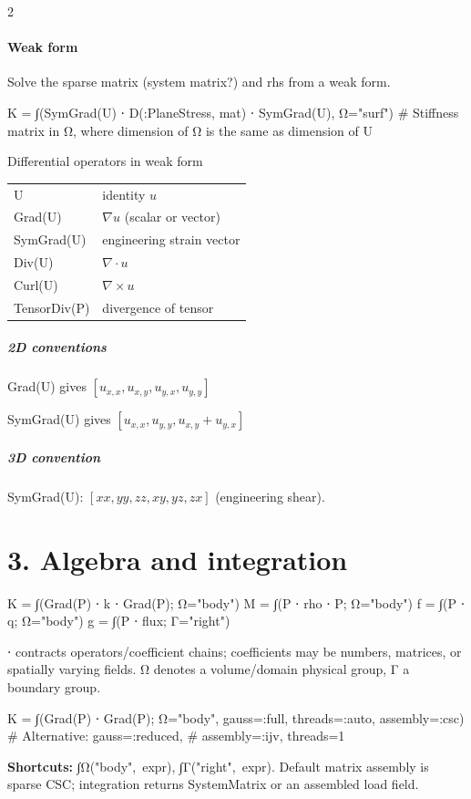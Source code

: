\documentclass[a4paper,11pt]{extarticle}
\newcommand{\code}[1]{\mbox{\ttfamily\small #1}}
\begin{document}
\begin{multicols}{2}
\paragraph{Weak form} Solve the sparse matrix (system matrix?) and rhs from a weak form.
\begin{julia}
K = ∫(SymGrad(U) ⋅ D(:PlaneStress, mat) ⋅ SymGrad(U), Ω="surf")		# Stiffness matrix in Ω, where dimension of Ω is the same as dimension of U 
\end{julia}
Differential operators in weak form

\begin{tabular}{@{}ll@{}}
\code{U} & identity $u$\\
\code{Grad(U)} & $\nabla u$ (scalar or vector)\\
\code{SymGrad(U)} & engineering strain vector\\
\code{Div(U)} & $\nabla\!\cdot u$\\
\code{Curl(U)} & $\nabla\!\times u$\\
\code{TensorDiv(P)} & divergence of tensor\\
\end{tabular}\par
\subparagraph{2D conventions} 

\code{Grad(U)} gives $[u_{x,x},u_{x,y},u_{y,x},u_{y,y}]$

\code{SymGrad(U)} gives $[u_{x,x},u_{y,y},u_{x,y}+u_{y,x}]$

\subparagraph{3D convention}

\code{SymGrad(U)}: $[xx,yy,zz,xy,yz,zx]$ (engineering shear).
\section{3. Algebra and integration}
\begin{julia}
K = ∫(Grad(P) ⋅ k ⋅ Grad(P); Ω="body")
M = ∫(P ⋅ rho ⋅ P; Ω="body")
f = ∫(P ⋅ q; Ω="body")
g = ∫(P ⋅ flux; Γ="right")
\end{julia}
\code{⋅} contracts operators/coefficient chains; coefficients may be numbers, matrices, or spatially varying fields. \code{Ω} denotes a volume/domain physical group, \code{Γ} a boundary group.
\begin{julia}
K = ∫(Grad(P) ⋅ Grad(P);
      Ω="body", gauss=:full,
      threads=:auto, assembly=:csc)
# Alternative: gauss=:reduced,
# assembly=:ijv, threads=1
\end{julia}
\textbf{Shortcuts:} \code{∫Ω("body", expr)}, \code{∫Γ("right", expr)}. Default matrix assembly is sparse CSC; integration returns \code{SystemMatrix} or an assembled load field.

\end{multicols}
\end{document}
